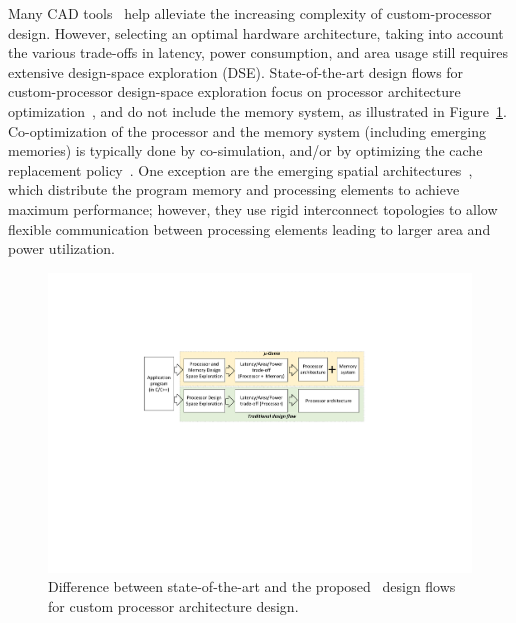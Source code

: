 Many CAD tools~\cite{synopsystool,tensilica,codasiptool} help alleviate the increasing complexity of custom-processor design. However, selecting an optimal hardware architecture, taking into account the various trade-offs in latency, power consumption, and area usage still requires extensive design-space exploration (DSE).
State-of-the-art design flows for custom-processor design-space exploration focus on processor architecture optimization~\cite{Meloni2012,EusseSAMOS2014,Jozwiak2013,Karuri2009}, and do not include the memory system, as illustrated in Figure~\ref{fig:intro}. Co-optimization of the processor and the memory system (including emerging memories) is typically done by co-simulation, and/or by optimizing the cache replacement policy~\cite{4798259,7092595,6271803,Mittal13f}.
One exception are the emerging spatial architectures~\cite{7284058,8686088}, which distribute the program memory and processing elements to achieve maximum performance; however, they use rigid interconnect topologies to allow flexible communication between processing elements leading to larger area and power utilization.

\begin{figure}[ht]
    \centering
    \includegraphics[clip, trim=6cm 10.5cm 6.4cm 5.2cm, width=1.0\linewidth]{images/intro_figure.pdf} %
    \caption{\small Difference between state-of-the-art and the proposed \frameworkname~design flows for custom processor architecture design.}
    \label{fig:intro}
\end{figure}

